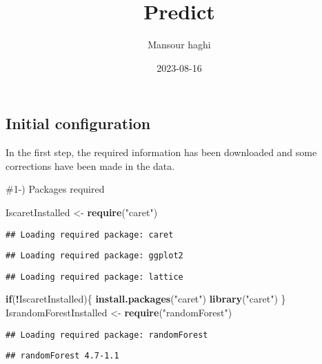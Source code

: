 \documentclass[
]{article}
\title{Predict}
\author{Mansour haghi}
\date{2023-08-16}
\newenvironment{Shaded}{\begin{snugshade}}{\end{snugshade}}
\newcommand{\ControlFlowTok}[1]{\textcolor[rgb]{0.13,0.29,0.53}{\textbf{#1}}}
\newcommand{\FunctionTok}[1]{\textcolor[rgb]{0.13,0.29,0.53}{\textbf{#1}}}
\newcommand{\NormalTok}[1]{#1}
\newcommand{\OtherTok}[1]{\textcolor[rgb]{0.56,0.35,0.01}{#1}}
\newcommand{\SpecialCharTok}[1]{\textcolor[rgb]{0.81,0.36,0.00}{\textbf{#1}}}
\newcommand{\StringTok}[1]{\textcolor[rgb]{0.31,0.60,0.02}{#1}}
\begin{document}
\maketitle

\hypertarget{initial-configuration}{%
\subsection{Initial configuration}\label{initial-configuration}}

In the first step, the required information has been downloaded and some
corrections have been made in the data.

\#1-) Packages required

\begin{Shaded}
\begin{Highlighting}[]
\NormalTok{IscaretInstalled }\OtherTok{\textless{}{-}} \FunctionTok{require}\NormalTok{(}\StringTok{"caret"}\NormalTok{)}
\end{Highlighting}
\end{Shaded}

\begin{verbatim}
## Loading required package: caret
\end{verbatim}

\begin{verbatim}
## Loading required package: ggplot2
\end{verbatim}

\begin{verbatim}
## Loading required package: lattice
\end{verbatim}

\begin{Shaded}
\begin{Highlighting}[]
\ControlFlowTok{if}\NormalTok{(}\SpecialCharTok{!}\NormalTok{IscaretInstalled)\{}
  \FunctionTok{install.packages}\NormalTok{(}\StringTok{"caret"}\NormalTok{)}
  \FunctionTok{library}\NormalTok{(}\StringTok{"caret"}\NormalTok{)}
\NormalTok{\}}
\NormalTok{IsrandomForestInstalled }\OtherTok{\textless{}{-}} \FunctionTok{require}\NormalTok{(}\StringTok{"randomForest"}\NormalTok{)}
\end{Highlighting}
\end{Shaded}

\begin{verbatim}
## Loading required package: randomForest
\end{verbatim}

\begin{verbatim}
## randomForest 4.7-1.1
\end{verbatim}
\end{document}
